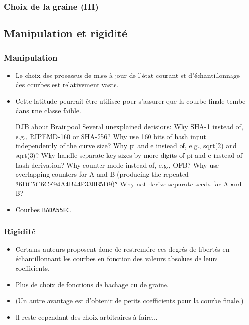\documentclass[francais]{beamer}
\begin{document}
\begin{frame}\frametitle{Choix de la graine (III)}
\begin{center}
\end{center}
\end{frame}

\subsection{Manipulation et rigidité}

\begin{frame}\frametitle{Manipulation}
\begin{itemize}
\item Le choix des processus de mise à jour de l'état courant et d'échantillonnage des courbes est relativement vaste.
\item Cette latitude pourrait être utilisée pour s'assurer que la courbe finale tombe dans une classe faible.
\begin{block}{DJB about Brainpool}
\small
Several unexplained decisions: Why SHA-1 instead of, e.g., RIPEMD-160 or SHA-256? Why use 160 bits of hash input independently of the curve size? Why pi and e instead of, e.g., sqrt(2) and sqrt(3)? Why handle separate key sizes by more digits of pi and e instead of hash derivation? Why counter mode instead of, e.g., OFB? Why use overlapping counters for A and B (producing the repeated 26DC5C6CE94A4B44F330B5D9)? Why not derive separate seeds for A and B?
\end{block}
\item Courbes \texttt{BADA55EC}.
\end{itemize}
\end{frame}

\begin{frame}\frametitle{Rigidité}
\begin{itemize}
\item Certains auteurs proposent donc de restreindre ces degrés de libertés en échantillonnant les courbes en fonction des valeurs absolues de leurs coefficients.
\item Plus de choix de fonctions de hachage ou de graine.
\item (Un autre avantage est d'obtenir de petits coefficients pour la courbe finale.)
\item Il reste cependant des choix arbitraires à faire...
\end{itemize}
\end{frame}
\end{document}
